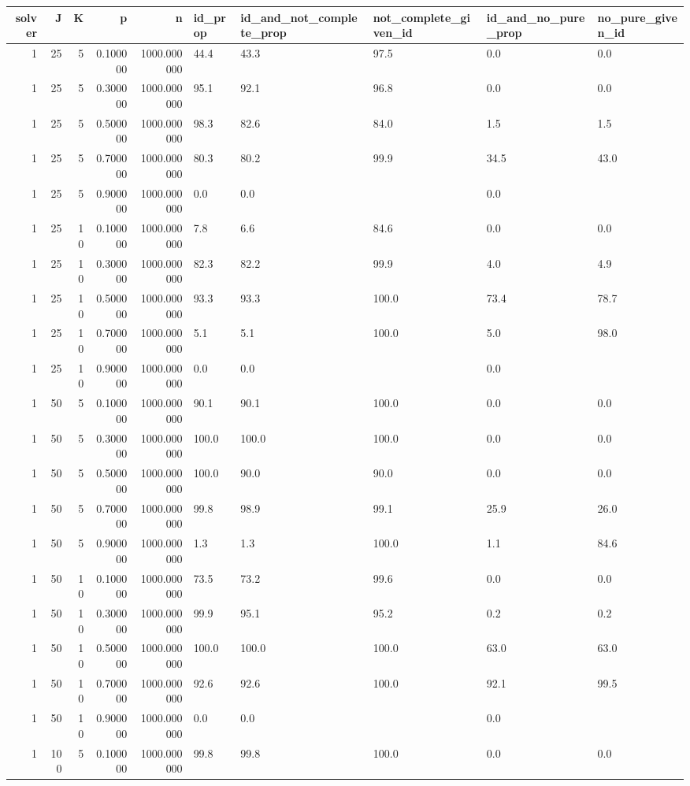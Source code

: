 \begin{tabular}{rrrrrlllll}
\toprule
solver & J & K & p & n & id_prop & id_and_not_complete_prop & not_complete_given_id & id_and_no_pure_prop & no_pure_given_id \\
\midrule
1 & 25 & 5 & 0.100000 & 1000.000000 & 44.4 & 43.3 & 97.5 & 0.0 & 0.0 \\
1 & 25 & 5 & 0.300000 & 1000.000000 & 95.1 & 92.1 & 96.8 & 0.0 & 0.0 \\
1 & 25 & 5 & 0.500000 & 1000.000000 & 98.3 & 82.6 & 84.0 & 1.5 & 1.5 \\
1 & 25 & 5 & 0.700000 & 1000.000000 & 80.3 & 80.2 & 99.9 & 34.5 & 43.0 \\
1 & 25 & 5 & 0.900000 & 1000.000000 & 0.0 & 0.0 &  & 0.0 &  \\
1 & 25 & 10 & 0.100000 & 1000.000000 & 7.8 & 6.6 & 84.6 & 0.0 & 0.0 \\
1 & 25 & 10 & 0.300000 & 1000.000000 & 82.3 & 82.2 & 99.9 & 4.0 & 4.9 \\
1 & 25 & 10 & 0.500000 & 1000.000000 & 93.3 & 93.3 & 100.0 & 73.4 & 78.7 \\
1 & 25 & 10 & 0.700000 & 1000.000000 & 5.1 & 5.1 & 100.0 & 5.0 & 98.0 \\
1 & 25 & 10 & 0.900000 & 1000.000000 & 0.0 & 0.0 &  & 0.0 &  \\
1 & 50 & 5 & 0.100000 & 1000.000000 & 90.1 & 90.1 & 100.0 & 0.0 & 0.0 \\
1 & 50 & 5 & 0.300000 & 1000.000000 & 100.0 & 100.0 & 100.0 & 0.0 & 0.0 \\
1 & 50 & 5 & 0.500000 & 1000.000000 & 100.0 & 90.0 & 90.0 & 0.0 & 0.0 \\
1 & 50 & 5 & 0.700000 & 1000.000000 & 99.8 & 98.9 & 99.1 & 25.9 & 26.0 \\
1 & 50 & 5 & 0.900000 & 1000.000000 & 1.3 & 1.3 & 100.0 & 1.1 & 84.6 \\
1 & 50 & 10 & 0.100000 & 1000.000000 & 73.5 & 73.2 & 99.6 & 0.0 & 0.0 \\
1 & 50 & 10 & 0.300000 & 1000.000000 & 99.9 & 95.1 & 95.2 & 0.2 & 0.2 \\
1 & 50 & 10 & 0.500000 & 1000.000000 & 100.0 & 100.0 & 100.0 & 63.0 & 63.0 \\
1 & 50 & 10 & 0.700000 & 1000.000000 & 92.6 & 92.6 & 100.0 & 92.1 & 99.5 \\
1 & 50 & 10 & 0.900000 & 1000.000000 & 0.0 & 0.0 &  & 0.0 &  \\
1 & 100 & 5 & 0.100000 & 1000.000000 & 99.8 & 99.8 & 100.0 & 0.0 & 0.0 \\

\end{tabular}
